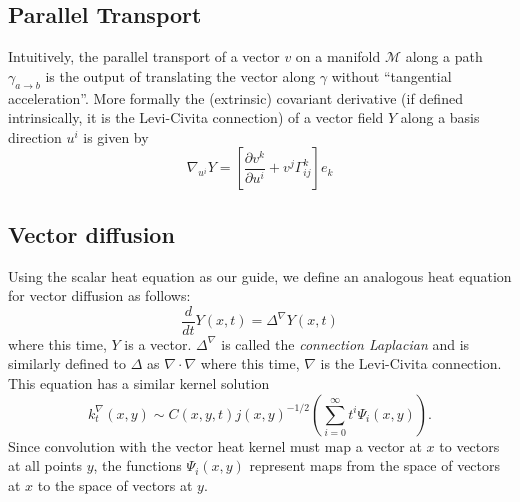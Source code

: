 \documentclass{article}
\newcommand{\del}{\partial}
\begin{document}
\subsection{Parallel Transport}
Intuitively, the parallel transport of a vector $v$ on a manifold $\mathcal{M}$
along a path $\gamma_{a \to b}$ is the output of translating the vector along
$\gamma$ without ``tangential acceleration''. More formally the (extrinsic)
covariant derivative (if defined intrinsically, it is the Levi-Civita connection) of a vector field $Y$ along a basis direction $u^{i}$ is given by
\begin{equation}\label{eqn:covderiv}
  \nabla_{u^{i}}Y = \left[\frac{\del v^{k}}{\del u^{i}} + v^{j} \Gamma^{k}_{{ij}}\right]e_{k}
\end{equation}

\subsection{Vector diffusion}
Using the scalar heat equation as our guide, we define an analogous heat
equation for vector diffusion as follows:
\begin{equation}\label{eqn:vecheat}
  \frac{d}{dt}Y(x, t) = \Delta^{\nabla} Y(x, t)
\end{equation}
where this time, $Y$ is a vector. $\Delta^{\nabla}$ is called the
\textit{connection Laplacian} and is similarly defined to $\Delta$ as
$ \nabla \cdot \nabla $ where this time, $\nabla$ is the Levi-Civita connection.
This equation has a similar kernel solution
\begin{equation}\label{eqn:vectorheatkernel}
  k_{t}^{\nabla}(x, y) \sim C(x, y, t)j(x, y)^{-1/2} \left(\sum_{i=0}^{\infty}t^{i}\Psi_{i}(x, y)\right).
\end{equation}
Since convolution with the vector heat kernel must map a vector at
$x$ to vectors at all points $y$, the functions $\Psi_{i}(x, y)$ represent maps
from the space of vectors at $x$ to the space of vectors at $y$.
\end{document}
